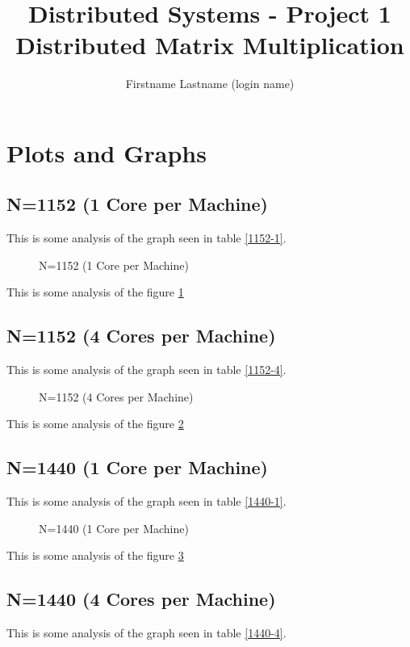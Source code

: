\documentclass[a4paper]{article}
\title{Distributed Systems - Project 1 \\ Distributed Matrix Multiplication}
\author{Firstname Lastname (login name)}
\begin{document}
\maketitle

\section{Plots and Graphs}

\subsection{N=1152 (1 Core per Machine)}

This is some analysis of the graph seen in table \ref{1152-1}.

\begin{figure}
    
    \caption{N=1152 (1 Core per Machine)}
    \label{fig:1152_1}
\end{figure}

This is some analysis of the figure \ref{fig:1152_1}

\subsection{N=1152 (4 Cores per Machine)}

This is some analysis of the graph seen in table \ref{1152-4}.

\begin{figure}
    
    \caption{N=1152 (4 Cores per Machine)}
    \label{fig:1152_4}
\end{figure}

This is some analysis of the figure \ref{fig:1152_4}

\subsection{N=1440 (1 Core per Machine)}

This is some analysis of the graph seen in table \ref{1440-1}.

\begin{figure}
    
    \caption{N=1440 (1 Core per Machine)}
    \label{fig:1440_1}
\end{figure}

This is some analysis of the figure \ref{fig:1440_1}

\subsection{N=1440 (4 Cores per Machine)}

This is some analysis of the graph seen in table \ref{1440-4}.
\end{document}
